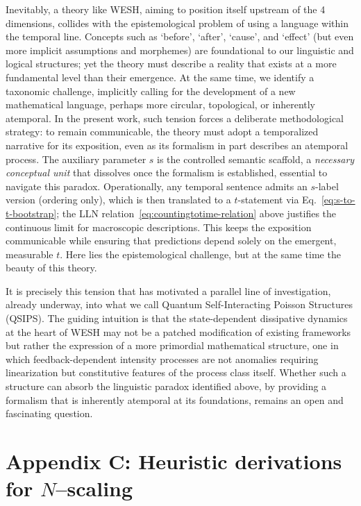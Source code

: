 \documentclass[12pt,a4paper]{article}
\numberwithin{equation}{section}
\begin{document}
\vspace{0.5cm}
Inevitably, a theory like WESH, aiming to position itself upstream of the 4 dimensions, collides with the epistemological problem of using a language within the temporal line. Concepts such as `before', `after', `cause', and `effect' (but even more implicit assumptions and morphemes) are foundational to our linguistic and logical structures; yet the theory must describe a reality that exists at a more fundamental level than their emergence. At the same time, we identify a taxonomic challenge, implicitly calling for the development of a new mathematical language, perhaps more circular, topological, or inherently atemporal. In the present work, such tension forces a deliberate methodological strategy: to remain communicable, the theory must adopt a temporalized narrative for its exposition, even as its formalism in part describes an atemporal process. The auxiliary parameter $s$ is the controlled semantic scaffold, a \emph{necessary conceptual unit} that dissolves once the formalism is established, essential to navigate this paradox. Operationally, any temporal sentence admits an $s$-label version (ordering only), which is then translated to a $t$-statement via Eq.~\eqref{eq:s-to-t-bootstrap}; the LLN relation~\eqref{eq:countingtotime-relation} above justifies the continuous limit for macroscopic descriptions. This keeps the exposition communicable while ensuring that predictions depend solely on the emergent, measurable $t$. Here lies the epistemological challenge, but at the same time the beauty of this theory.

\vspace{0.3cm}
\noindent It is precisely this tension that has motivated a parallel line of investigation, already underway, into what we call Quantum Self-Interacting Poisson Structures (QSIPS). The guiding intuition is that the state-dependent dissipative dynamics at the heart of WESH may not be a patched modification of existing frameworks but rather the expression of a more primordial mathematical structure, one in which feedback-dependent intensity processes are not anomalies requiring linearization but constitutive features of the process class itself. Whether such a structure can absorb the linguistic paradox identified above, by providing a formalism that is inherently atemporal at its foundations, remains an open and fascinating question.
\endgroup

\vspace{1cm}

\section*{Appendix C: Heuristic derivations for $N$–scaling}
\label{app:heuristics}
\end{document}
